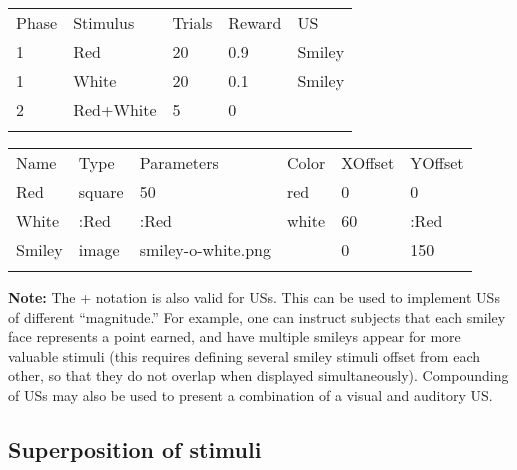 \documentclass[11pt,]{article}
\renewcommand{\medskip}{}
\begin{document}
\begin{table*}[t]\begin{center}\small\begin{tabular}{@{}lllll@{}}
\hline\noalign{\medskip}
Phase & Stimulus & Trials & Reward & US
\\\noalign{\medskip}
\hline\noalign{\medskip}
1 & Red & 20 & 0.9 & Smiley
\\\noalign{\medskip}
1 & White & 20 & 0.1 & Smiley
\\\noalign{\medskip}
2 & Red+White & 5 & 0 &
\\\noalign{\medskip}
\hline
\noalign{\medskip}
\end{tabular}\caption{A \texttt{Phases.csv} file with a compound stimulus in phase 2.
\label{phases-plus}}
\end{center}\end{table*}

\begin{table*}[t]\begin{center}\small\begin{tabular}{@{}llllll@{}}
\hline\noalign{\medskip}
Name & Type & Parameters & Color & XOffset & YOffset
\\\noalign{\medskip}
\hline\noalign{\medskip}
Red & square & 50 & red & 0 & 0
\\\noalign{\medskip}
White & :Red & :Red & white & 60 & :Red
\\\noalign{\medskip}
Smiley & image & smiley-o-white.png & & 0 & 150
\\\noalign{\medskip}
\hline
\noalign{\medskip}
\end{tabular}\caption{A \texttt{Stimuli.csv} file to go with the \texttt{Phases.csv}
file in Table \ref{phases-plus}. Note that we need to offset the white
square, otherwise it would overlap with the red one when the two are
presented together. \label{stimuli-plus}}
\end{center}\end{table*}

\textbf{Note:} The + notation is also valid for USs. This can be used to
implement USs of different ``magnitude.'' For example, one can instruct
subjects that each smiley face represents a point earned, and have
multiple smileys appear for more valuable stimuli (this requires
defining several smiley stimuli offset from each other, so that they do
not overlap when displayed simultaneously). Compounding of USs may also
be used to present a combination of a visual and auditory US.

\subsection{Superposition of stimuli}
\end{document}
